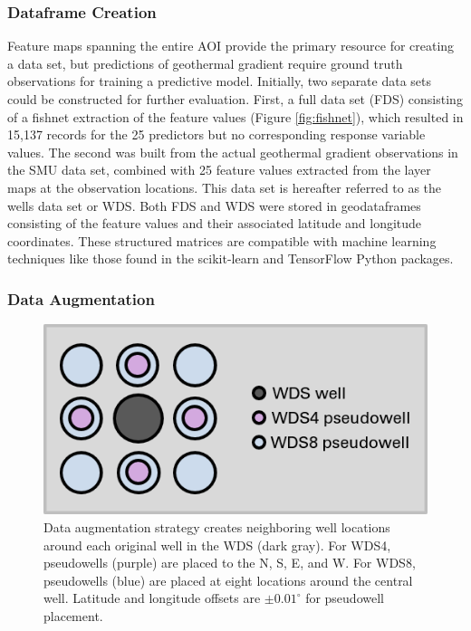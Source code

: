 \subsubsection{Dataframe Creation}
Feature maps spanning the entire AOI provide the primary resource for creating a data set, but predictions of geothermal gradient require ground truth observations for training a predictive model. Initially, two separate data sets could be constructed for further evaluation. First, a full data set (FDS) consisting of a fishnet extraction of the feature values (Figure \ref{fig:fishnet}), which resulted in 15,137 records for the 25 predictors but no corresponding response variable values. The second was built from the actual geothermal gradient observations in the SMU data set, combined with 25 feature values extracted from the layer maps at the observation locations. This data set is hereafter referred to as the wells data set or WDS. Both FDS and WDS were stored in geodataframes consisting of the feature values and their associated latitude and longitude coordinates. These structured matrices are compatible with machine learning techniques like those found in the scikit-learn \citep{pedregosa_scikit-learn_2011} and TensorFlow \citep{abadi_tensorflow_2016} Python packages. 

\subsubsection{Data Augmentation}
\begin{figure}
\centering
\includegraphics[scale=0.9]{templates/images/Figure-AugmentedWells.png}
\singlespacing
\caption[Data augmentation strategy]{Data augmentation strategy creates neighboring well locations around each original well in the WDS (dark gray). For WDS4, pseudowells (purple) are placed to the N, S, E, and W. For WDS8, pseudowells (blue) are placed at eight locations around the central well. Latitude and longitude offsets are $\pm0.01^\circ$ for pseudowell placement.}
\label{fig:data_augmentation}
\end{figure}

